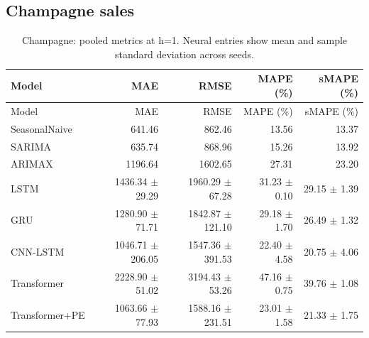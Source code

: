 \documentclass[10pt,a4paper]{article}
\begin{document}
\subsection{Champagne sales}
\begin{center}\begingroup\footnotesize\setlength{\tabcolsep}{3pt}\begin{longtable}{@{}lrrrr@{}}\caption{Champagne: pooled metrics at h=1. Neural entries show mean and sample standard deviation across seeds.}\\\toprule Model & MAE & RMSE & MAPE (\%) & sMAPE (\%)\\\midrule\endfirsthead\toprule Model & MAE & RMSE & MAPE (\%) & sMAPE (\%)\\\midrule\endhead SeasonalNaive & 641.46 & 862.46 & 13.56 & 13.37 \\
SARIMA & 635.74 & 868.96 & 15.26 & 13.92 \\
ARIMAX & 1196.64 & 1602.65 & 27.31 & 23.20 \\
LSTM & 1436.34 $\pm$ 29.29 & 1960.29 $\pm$ 67.28 & 31.23 $\pm$ 0.10 & 29.15 $\pm$ 1.39 \\
GRU & 1280.90 $\pm$ 71.71 & 1842.87 $\pm$ 121.10 & 29.18 $\pm$ 1.70 & 26.49 $\pm$ 1.32 \\
CNN-LSTM & 1046.71 $\pm$ 206.05 & 1547.36 $\pm$ 391.53 & 22.40 $\pm$ 4.58 & 20.75 $\pm$ 4.06 \\
Transformer & 2228.90 $\pm$ 51.02 & 3194.43 $\pm$ 53.26 & 47.16 $\pm$ 0.75 & 39.76 $\pm$ 1.08 \\
Transformer+PE & 1063.66 $\pm$ 77.93 & 1588.16 $\pm$ 231.51 & 23.01 $\pm$ 1.58 & 21.33 $\pm$ 1.75 \\\bottomrule\end{longtable}\endgroup\end{center}
\end{document}
